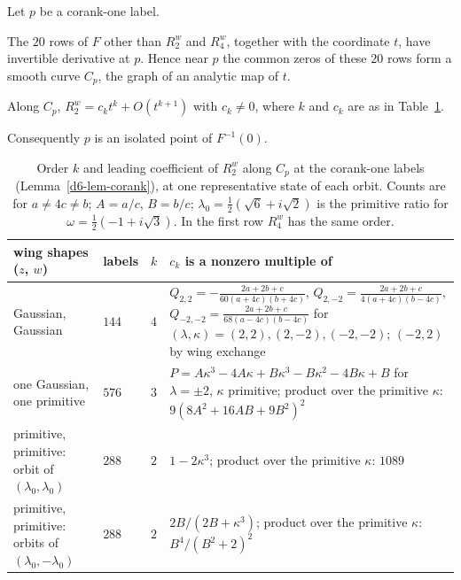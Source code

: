 \begin{lemma}\label{d6-lem-corank}
Let $p$ be a corank-one label.
\begin{romanlist}
  \item The $20$ rows of $F$ other than $R^w_2$ and $R^w_4$, together with the coordinate $t$,
  have invertible derivative at $p$.  Hence near $p$ the common zeros of these $20$ rows form a
  smooth curve $C_p$, the graph of an analytic map of $t$.
  \item Along $C_p$, $R^w_2=c_kt^k+O(t^{k+1})$ with $c_k\ne0$, where $k$ and $c_k$ are as in
  Table~\ref{d6-tab-corank}.
  \item Consequently $p$ is an isolated point of $F^{-1}(0)$.
\end{romanlist}
\end{lemma}

\begin{table}[ht]
\centering
\small
\begin{tabular}{p{3.3cm}p{0.9cm}p{0.3cm}p{6.6cm}}
\hline
wing shapes ($z$, $w$) & labels & $k$ & $c_k$ is a nonzero multiple of \\
\hline
Gaussian, Gaussian & $144$ & $4$ &
$Q_{2,2}=-\frac{2a+2b+c}{60(a+4c)(b+4c)}$, $Q_{2,-2}=\frac{2a+2b+c}{4(a+4c)(b-4c)}$,
$Q_{-2,-2}=\frac{2a+2b+c}{68(a-4c)(b-4c)}$ for $(\lambda,\kappa)=(2,2),(2,-2),(-2,-2)$;
$(-2,2)$ by wing exchange \\
one Gaussian, one primitive & $576$ & $3$ &
$P=A\kappa^3-4A\kappa+B\kappa^3-B\kappa^2-4B\kappa+B$ for $\lambda=\pm2$, $\kappa$ primitive;
product over the primitive $\kappa$: $9(8A^2+16AB+9B^2)^2$ \\
primitive, primitive: orbit of $(\lambda_0,\lambda_0)$ & $288$ & $2$ &
$1-2\kappa^3$; product over the primitive $\kappa$: $1089$ \\
primitive, primitive: orbits of $(\lambda_0,-\lambda_0)$ & $288$ & $2$ &
$2B/(2B+\kappa^3)$; product over the primitive $\kappa$: $B^4/(B^2+2)^2$ \\
\hline
\end{tabular}
\caption{Order $k$ and leading coefficient of $R^w_2$ along $C_p$ at the corank-one labels
(Lemma~\ref{d6-lem-corank}), at one representative state of each orbit.  Counts are for
$a\ne4c\ne b$; $A=a/c$, $B=b/c$; $\lambda_0=\frac12(\sqrt6+i\sqrt2)$ is the primitive ratio for
$\omega=\frac12(-1+i\sqrt3)$.  In the first row $R^w_4$ has the same order.}\label{d6-tab-corank}
\end{table}

